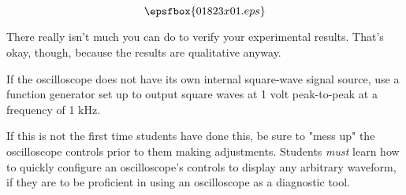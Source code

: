 

$$\epsfbox{01823x01.eps}$$

\vfil \eject






There really isn't much you can do to verify your experimental results.  That's okay, though, because the results are qualitative anyway.







If the oscilloscope does not have its own internal square-wave signal source, use a function generator set up to output square waves at 1 volt peak-to-peak at a frequency of 1 kHz.

If this is not the first time students have done this, be sure to "mess up" the oscilloscope controls prior to them making adjustments.  Students {\it must} learn how to quickly configure an oscilloscope's controls to display any arbitrary waveform, if they are to be proficient in using an oscilloscope as a diagnostic tool.




